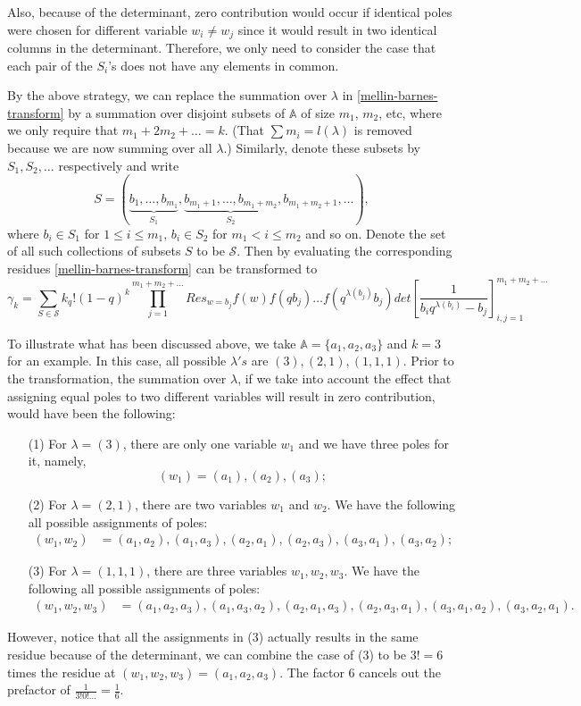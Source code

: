 Also, because of the determinant, zero contribution would occur if identical poles were chosen for different variable $w_i \neq w_j$ since it would result in two identical columns in the determinant. Therefore, we only need to consider the case that each pair of the $S_i$'s does not have any elements in common. 

By the above strategy, we can replace the summation over $\lambda$ in \eqref{mellin-barnes-transform} by a summation over disjoint subsets of $\mathbb{A}$ of size $m_1$, $m_2$, etc, where we only require that $m_1 + 2m_2 + \dots = k$. (That $\sum m_i = l(\lambda)$ is removed because we are now summing over all $\lambda$.) Similarly, denote these subsets by $S_1, S_2, \dots$ respectively and write 
$$S = (\underbrace{b_1, \dots, b_{m_1}}_{S_1}, \underbrace{b_{m_1+1}, \dots, b_{m_1 + m_2}}_{S_2},  b_{m_1 + m_2+1}, \dots),$$ 
where $b_i \in S_1$ for $1 \le i \le m_1$, $b_i \in S_2$ for $m_1 < i \le m_2$ and so on. Denote the set of all such collections of subsets $S$ to be $\mathcal{S}$. Then by evaluating the corresponding residues \eqref{mellin-barnes-transform} can be transformed to
\begin{equation}
\gamma_k = \sum_{S \in \mathcal{S}} k_q! (1-q)^k \prod_{j=1}^{m_1+m_2+\dots} Res_{w=b_j} f(w) f(qb_j) \dots f(q^{\lambda(b_j)} b_j) det\left[ \frac{1}{b_iq^{\lambda(b_i)} - b_j} \right]_{i,j=1}^{m_1+m_2+\dots}
\end{equation}

To illustrate what has been discussed above, we take $\mathbb{A} = \{a_1, a_2, a_3\}$ and $k = 3$ for an example. In this case, all possible $\lambda 's$ are $(3), (2,1), (1,1,1)$. Prior to the transformation, the summation over $\lambda$, if we take into account the effect that assigning equal poles to two different variables will result in zero contribution, would have been the following:
\begin{itemize}
\item[(1)] For $\lambda = (3)$, there are only one variable $w_1$ and we have three poles for it, namely, $$(w_1) = (a_1),(a_2), (a_3);$$
\item[(2)] For $\lambda = (2,1)$, there are two variables $w_1$ and $w_2$. We have the following all possible assignments of poles:
\begin{align*}
(w_1, w_2) &= (a_1, a_2), (a_1, a_3), (a_2, a_1), (a_2, a_3), (a_3, a_1), (a_3, a_2);
\end{align*}
\item[(3)] For $\lambda = (1,1,1)$, there are three variables $w_1, w_2, w_3$. We have the following all possible assignments of poles:
\begin{align*}
(w_1, w_2, w_3) &= (a_1, a_2, a_3), (a_1, a_3, a_2), (a_2, a_1, a_3), (a_2, a_3, a_1), (a_3, a_1, a_2), (a_3, a_2, a_1).
\end{align*}
\end{itemize}
However, notice that all the assignments in (3) actually results in the same residue because of the determinant, we can combine the case of (3) to be $3! = 6$ times the residue at $(w_1, w_2, w_3) = (a_1, a_2, a_3)$. The factor $6$ cancels out the prefactor of $\frac{1}{3!0!\dots} = \frac{1}{6}$.

